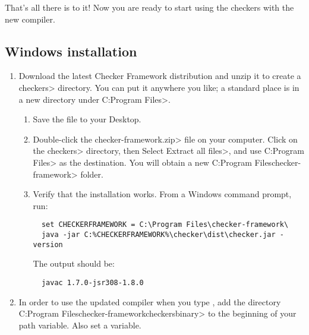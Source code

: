 That's all there is to it!  Now you are ready to start using the checkers with
the new  compiler.

\subsection{Windows installation\label{windows-installation}}

\begin{enumerate}

\item
  Download the latest Checker Framework distribution
  and unzip it to create a \<checkers> directory.  You can put it anywhere
  you like; a standard place is in a new directory under \<C:\ttbs{}Program
  Files>.

\begin{enumerate}
\item
  Save the file
  to your Desktop.
\item
  Double-click the \<checker-framework.zip> file on your computer.  Click on
  the \<checkers> directory, then Select \<Extract all files>, and use
  \<C:\ttbs{}Program Files> as the destination.  You will obtain a new
  \<C:\ttbs{}Program Files\ttbs{}checker-framework> folder.
\item
  Verify that the installation works.  From a Windows command prompt, run:

\begin{Verbatim}
  set CHECKERFRAMEWORK = C:\Program Files\checker-framework\
  java -jar C:%CHECKERFRAMEWORK%\checker\dist\checker.jar -version
\end{Verbatim}

The output should be:

\begin{Verbatim}
  javac 1.7.0-jsr308-1.8.0
\end{Verbatim}

\end{enumerate}


\item
\begin{sloppypar}
  In order to use the updated compiler when you type , add the
  directory \<C:\ttbs{}Program Files\ttbs{}checker-framework\ttbs{}checkers\ttbs{}binary> to the
  beginning of your path variable.  Also set a \code{CHECKERFRAMEWORK} variable.
\end{sloppypar}


\end{enumerate}
